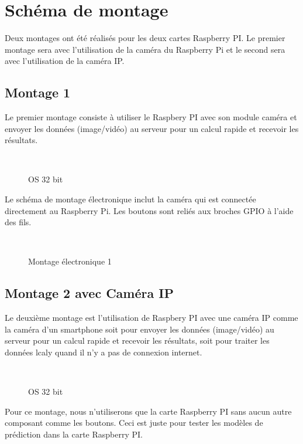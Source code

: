{\section{Schéma de montage}
Deux montages ont été réalisés pour les deux cartes Raspberry PI. Le premier montage sera avec l'utilisation de la caméra du Raspberry Pi et le second sera avec l'utilisation de la caméra IP.
    \subsection{Montage 1}
    Le premier montage consiste à utiliser le Raspbery PI avec son module caméra et envoyer les données (image/vidéo) au serveur pour un calcul rapide et recevoir les résultats.
    \begin{figure}[H] 
    \centering
    \\[0.5cm]
    \caption{OS 32 bit}
    \label{fig:figure12}
    \end{figure}
    Le schéma de montage électronique inclut la caméra qui est connectée directement au Raspberry Pi. Les boutons sont reliés aux broches GPIO à l'aide des fils. 
    \begin{figure}[H] 
    \centering
    \\[0.5cm]
    \caption{Montage électronique 1}
    \label{fig:figure12}
    \end{figure}
    
    
    
    \subsection{Montage 2 avec Caméra IP}
    Le deuxième montage est l'utilisation de Raspbery PI avec une caméra IP comme la caméra d'un smartphone soit pour envoyer les données (image/vidéo) au serveur pour un calcul rapide et recevoir les résultats, soit pour traiter les données lcaly quand il n'y a pas de connexion internet.
    \begin{figure}[H] 
    \centering
    \\[0.5cm]
    \caption{OS 32 bit}
    \label{fig:figure12}
    \end{figure}
    Pour ce montage, nous n'utiliserons que la carte Raspberry PI sans aucun autre composant comme les boutons. Ceci est juste pour tester les modèles de prédiction dans la carte Raspberry PI.

}
